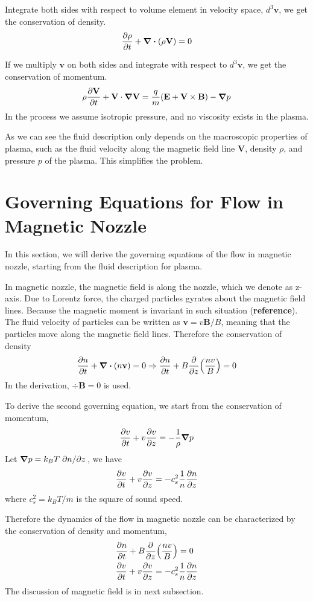 Integrate both sides with respect to volume element in velocity space, $d^3\mathbf{v}$, we get the conservation of density.
\[ \pdv{\rho}{t} + \div(\rho\mathbf{V}) = 0 \]

If we multiply $\mathbf{v}$ on both sides and integrate with respect to $d^3\mathbf{v}$, we get the conservation of momentum.
\[ \rho\pdv{\mathbf{V}}{t} + \mathbf{V}\cdot\grad{\mathbf{V}} = \frac{q}{m}(\mathbf{E+V\times B}) - \grad{p} \]
In the process we assume isotropic pressure, and no viscosity exists in the plasma.

As we can see the fluid description only depends on the macroscopic properties of plasma, such as the fluid velocity along the magnetic field line $\mathbf{V}$, density $\rho$, and pressure $p$ of the plasma. This simplifies the problem.

\section{Governing Equations for Flow in Magnetic Nozzle}
In this section, we will derive the governing equations of the flow in magnetic nozzle, starting from the fluid description for plasma.

In magnetic nozzle, the magnetic field is along the nozzle, which we denote as z-axis. Due to Lorentz force, the charged particles gyrates about the magnetic field lines. Because the magnetic moment is invariant in such situation (\textbf{reference}). The fluid velocity of particles can be written as $\mathbf{v} = v\mathbf{B}/B$, meaning that the particles move along the magnetic field lines. Therefore the conservation of density 
\[ 
\pdv{n}{t} + \div(n\mathbf{v}) = 0 
\Rightarrow 
\pdv{n}{t} + B\pdv{z}(\frac{nv}{B}) = 0  
\]
In the derivation, $\div{\mathbf{B}} = 0$ is used.

To derive the second governing equation, we start from the conservation of momentum, 
\[ \pdv{v}{t} + v\pdv{v}{z} = -\frac{1}{\rho}\grad{p} \]
Let $\grad{p} = k_BT\pdv*{n}{z}$, we have
\[ \pdv{v}{t} + v\pdv{v}{z} = -c_s^2\frac{1}{n}\pdv{n}{z} \]
where $c_s^2 = k_BT/m$ is the square of sound speed.

Therefore the dynamics of the flow in magnetic nozzle can be characterized by the conservation of density and momentum,
\begin{align*}
	&\pdv{n}{t} + B\pdv{z}(\frac{nv}{B}) = 0\\
	&\pdv{v}{t} + v\pdv{v}{z} = -c_s^2\frac{1}{n}\pdv{n}{z}
\end{align*}
The discussion of magnetic field is in next subsection.


